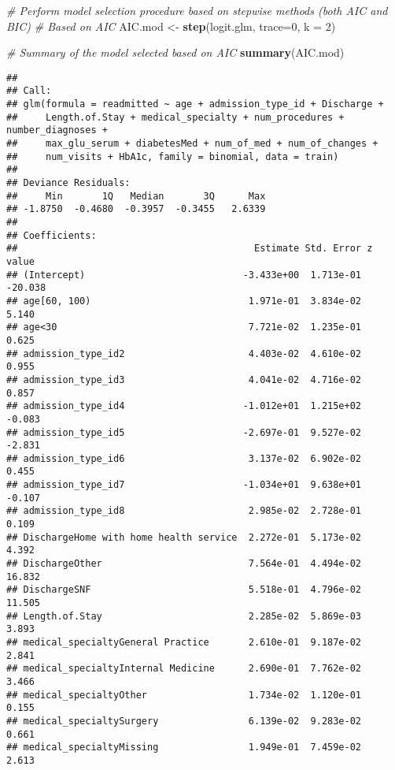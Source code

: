 \documentclass[
]{article}
\newenvironment{Shaded}{\begin{snugshade}}{\end{snugshade}}
\newcommand{\CommentTok}[1]{\textcolor[rgb]{0.56,0.35,0.01}{\textit{#1}}}
\newcommand{\DataTypeTok}[1]{\textcolor[rgb]{0.13,0.29,0.53}{#1}}
\newcommand{\DecValTok}[1]{\textcolor[rgb]{0.00,0.00,0.81}{#1}}
\newcommand{\KeywordTok}[1]{\textcolor[rgb]{0.13,0.29,0.53}{\textbf{#1}}}
\newcommand{\NormalTok}[1]{#1}
\newcommand{\StringTok}[1]{\textcolor[rgb]{0.31,0.60,0.02}{#1}}
\begin{document}
\begin{Shaded}
\begin{Highlighting}[]
\CommentTok{# Perform model selection procedure based on stepwise methods (both AIC and BIC)}
\CommentTok{# Based on AIC}
\NormalTok{AIC.mod <-}\StringTok{ }\KeywordTok{step}\NormalTok{(logit.glm, }\DataTypeTok{trace=}\DecValTok{0}\NormalTok{, }\DataTypeTok{k =} \DecValTok{2}\NormalTok{)}

\CommentTok{# Summary of the model selected based on AIC}
\KeywordTok{summary}\NormalTok{(AIC.mod)}
\end{Highlighting}
\end{Shaded}

\begin{verbatim}
## 
## Call:
## glm(formula = readmitted ~ age + admission_type_id + Discharge + 
##     Length.of.Stay + medical_specialty + num_procedures + number_diagnoses + 
##     max_glu_serum + diabetesMed + num_of_med + num_of_changes + 
##     num_visits + HbA1c, family = binomial, data = train)
## 
## Deviance Residuals: 
##     Min       1Q   Median       3Q      Max  
## -1.8750  -0.4680  -0.3957  -0.3455   2.6339  
## 
## Coefficients:
##                                          Estimate Std. Error z value
## (Intercept)                            -3.433e+00  1.713e-01 -20.038
## age[60, 100)                            1.971e-01  3.834e-02   5.140
## age<30                                  7.721e-02  1.235e-01   0.625
## admission_type_id2                      4.403e-02  4.610e-02   0.955
## admission_type_id3                      4.041e-02  4.716e-02   0.857
## admission_type_id4                     -1.012e+01  1.215e+02  -0.083
## admission_type_id5                     -2.697e-01  9.527e-02  -2.831
## admission_type_id6                      3.137e-02  6.902e-02   0.455
## admission_type_id7                     -1.034e+01  9.638e+01  -0.107
## admission_type_id8                      2.985e-02  2.728e-01   0.109
## DischargeHome with home health service  2.272e-01  5.173e-02   4.392
## DischargeOther                          7.564e-01  4.494e-02  16.832
## DischargeSNF                            5.518e-01  4.796e-02  11.505
## Length.of.Stay                          2.285e-02  5.869e-03   3.893
## medical_specialtyGeneral Practice       2.610e-01  9.187e-02   2.841
## medical_specialtyInternal Medicine      2.690e-01  7.762e-02   3.466
## medical_specialtyOther                  1.734e-02  1.120e-01   0.155
## medical_specialtySurgery                6.139e-02  9.283e-02   0.661
## medical_specialtyMissing                1.949e-01  7.459e-02   2.613

\end{verbatim}
\end{document}
